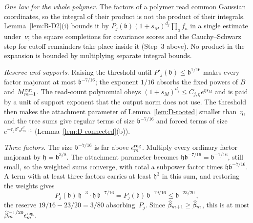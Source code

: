 \emph{One law for the whole polymer.} The factors of a polymer read common Gaussian coordinates, so the integral of their product is not the product of their integrals. Lemma~\ref{lem:B-D2}(i) bounds it by $P_j(\mathfrak b)(1+s_M)^{d_j}\prod_af_a$ in a single estimate under~$\nu$; the square completions for covariance scores and the Cauchy--Schwarz step for cutoff remainders take place inside it (Step~3 above). No product in the expansion is bounded by multiplying separate integral bounds.

\emph{Reserve and supports.} Raising the threshold until $P'_j(\mathfrak b)\le\mathfrak b^{1/16}$ makes every factor majorant at most $\mathfrak b^{-7/16}$; the exponent $1/16$ absorbs the fixed powers of $B$ and $M^{\mathrm{cut}}_{m+1}$. The read-count polynomial obeys $(1+s_M)^{d_j}\le C_{j,\eta}e^{\eta s_M}$ and is paid by a unit of support exponent that the output norm does not use. The threshold then makes the attachment parameter of Lemma~\ref{lem:D-rooted} smaller than~$\eta$, and the tree sums give regular terms of size $\mathfrak b^{-7/16}$ and forced terms of size $e^{-r_j\beta'_ut_{m+1}^2}$ (Lemma~\ref{lem:D-connected}(b)).

\emph{Three factors.} The size $\mathfrak b^{-7/16}$ is far above $\epsilon^{\rm reg}_m$. Multiply every ordinary factor majorant by $\mathfrak h=\mathfrak b^{3/8}$. The attachment parameter becomes $\mathfrak h\mathfrak b^{-7/16}=\mathfrak b^{-1/16}$, still small, so the weighted sums converge, with total a subpower factor times $\mathfrak h\mathfrak b^{-7/16}$. A term with at least three factors carries at least $\mathfrak h^3$ in this sum, and restoring the weights gives
\begin{equation*}
P_j(\mathfrak b)\,\mathfrak h^{-3}\cdot\mathfrak h\,\mathfrak b^{-7/16}=P_j(\mathfrak b)\,\mathfrak b^{-19/16}\le\mathfrak b^{-23/20}\,,
\end{equation*}
the reserve $19/16-23/20=3/80$ absorbing~$P_j$. Since $\widehat{\beta}_{m+1}\ge\widehat{\beta}_m$, this is at most $\widehat{\beta}_m^{-1/20}\epsilon^{\rm reg}_m$.


